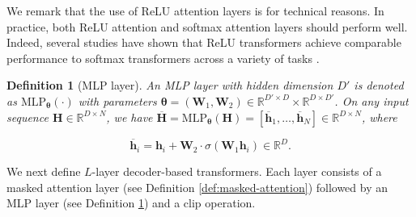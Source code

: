\documentclass[10pt]{article}
\newtheorem{definition}[theorem]{Definition}
\renewcommand{\bar}{\overline}
\newcommand{\<}{\left\langle}
\renewcommand{\>}{\right\rangle}
\newcommand{\MLP}{\mathrm{MLP}}
\newcommand{\R}{\mathbb{R}}
\def\bH{{\mathbf H}}
\def\bW{{\mathbf W}}
\def\btheta{{\boldsymbol \theta}}
\def\bh{{\mathbf h}}
\begin{document}
We remark that the use of ReLU attention layers is for technical reasons. In practice, both ReLU attention and softmax attention layers should perform well. Indeed, several studies have shown that ReLU transformers achieve comparable performance to softmax transformers  across a variety of tasks \citep{wortsman2023replacing, shen2023study, bai2023transformers}.

\begin{definition}[MLP layer]
\label{def:mlp}
An MLP layer with hidden dimension $D'$ is denoted as $\MLP_{\btheta}(\cdot)$ with parameters $\btheta=(\bW_1,\bW_2)\in\R^{D'\times D}\times\R^{D\times D'}$. On any input sequence $\bH\in\R^{D\times N}$, we have $\bar{\bH} = \MLP_{\btheta}(\bH) = [\bar{\bh}_1, \ldots, \bar{\bh}_N] \in \R^{D \times N}$, where





\[
\bar{\bh}_i=\bh_i+\bW_2 \cdot \sigma(\bW_1\bh_i) \in \R^D.
\]
\end{definition}
We next define $L$-layer decoder-based transformers. Each layer consists of a masked attention layer (see Definition \ref{def:masked-attention}) followed by an MLP layer (see Definition \ref{def:mlp}) and a clip operation. 
\end{document}
